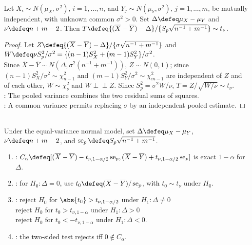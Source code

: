 \begin{theorem} \label{thm:two-sample-pooled-t-pivot} \\
Let $X_i\sim N(\mu_X,\sigma^2)$, $i=1,\ldots,n$, and $Y_j\sim N(\mu_Y,\sigma^2)$, $j=1,\ldots,m$, be mutually independent, with unknown common $\sigma^2>0$. Set $\Delta\defeq\mu_X-\mu_Y$ and $\nu\defeq n+m-2$. Then $T\defeq\{(\overline{X}-\overline{Y})-\Delta\}/\{S_p\sqrt{n^{-1}+m^{-1}}\}\sim t_\nu$.
\begin{proof}
Let $Z\defeq\{(\overline{X}-\overline{Y})-\Delta\}/\{\sigma\sqrt{n^{-1}+m^{-1}}\}$ and $W\defeq\nu S_p^2/\sigma^2=\{(n-1)S_X^2+(m-1)S_Y^2\}/\sigma^2$.\\
Since $\overline{X}-\overline{Y}\sim N(\Delta,\sigma^2(n^{-1}+m^{-1}))$, $Z\sim N(0,1)$; since $(n-1)S_X^2/\sigma^2\sim\chi^2_{n-1}$ and $(m-1)S_Y^2/\sigma^2\sim\chi^2_{m-1}$ are independent of $Z$ and of each other, $W\sim\chi^2_\nu$ and $W\perp\!\!\!\perp Z$. Since $S_p^2=\sigma^2W/\nu$, $T=Z/\sqrt{W/\nu}\sim t_\nu$.\\
: The pooled variance combines the two residual sums of squares.\\
: A common variance permits replacing $\sigma$ by an independent pooled estimate.
\end{proof}
\end{theorem}

\begin{method} \label{meth:pooled-two-sample-t-interval-and-tests} \\
Under the equal-variance normal model, set $\Delta\defeq\mu_X-\mu_Y$, $\nu\defeq n+m-2$, and $\operatorname{se}_p\defeq S_p\sqrt{n^{-1}+m^{-1}}$.
\begin{enumerate}[label=(\roman*)]
\setlength{\itemsep}{0pt}
\item {}: $C_\alpha\defeq[(\overline{X}-\overline{Y})-t_{\nu,1-\alpha/2}\operatorname{se}_p,(\overline{X}-\overline{Y})+t_{\nu,1-\alpha/2}\operatorname{se}_p]$ is exact $1-\alpha$ for $\Delta$.
\item {}: for $H_0:\Delta=0$, use $t_0\defeq(\overline{X}-\overline{Y})/\operatorname{se}_p$, with $t_0\sim t_\nu$ under $H_0$.
\item {}: reject $H_0$ for $\abs{t_0}>t_{\nu,1-\alpha/2}$ under $H_1:\Delta\neq0$\\
reject $H_0$ for $t_0>t_{\nu,1-\alpha}$ under $H_1:\Delta>0$\\
reject $H_0$ for $t_0<-t_{\nu,1-\alpha}$ under $H_1:\Delta<0$.
\item {}: the two-sided test rejects iff $0\notin C_\alpha$.
\end{enumerate}
\end{method}

